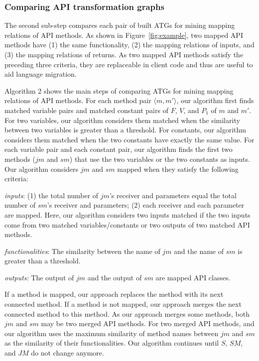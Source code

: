 \subsubsection{Comparing API transformation graphs} The
second sub-step compares each pair of built ATGs for mining mapping
relations of API methods. As shown in Figure~\ref{fig:example}, two
mapped API methods have (1) the same functionality, (2) the mapping
relations of inputs, and (3) the mapping relations of returns. As
two mapped API methods satisfy the preceding three criteria, they
are replaceable in client code and thus are useful to aid language
migration.

Algorithm 2 shows the main steps of comparing ATGs for mining
mapping relations of API methods. For each method pair $\langle m,
m'\rangle$, our algorithm first finds matched variable pairs and
matched constant pairs of $F$, $V$, and $P_1$ of $m$ and $m'$. For
two variables, our algorithm considers them matched when the
similarity between two variables is greater than a threshold. For
constants, our algorithm considers them matched when the two
constants have exactly the same value. For each variable pair and
each constant pair, our algorithm finds the first two methods ($jm$
and $sm$) that use the two variables or the two constants as inputs.
Our algorithm considers $jm$ and $sm$ mapped when they satisfy the
following criteria:

\emph{inputs}: (1) the total number of $jm$'s receiver and
parameters equal the total number of $sm$'s receiver and parameters;
(2) each receiver and each parameter are mapped. Here, our algorithm
considers two inputs matched if the two inputs come from two matched
variables/constants or two outputs of two matched API methods.

\emph{functionalities}: The similarity between the name of $jm$ and
the name of $sm$ is greater than a threshold.

\emph{outputs:} The output of $jm$ and the output of $sm$ are mapped
API classes.

If a method is mapped, our approach replaces the method with its
next connected method. If a method is not mapped, our approach
merges the next connected method to this method. As our approach
merges some methods, both $jm$ and $sm$ may be two merged API
methods. For two merged API methods, and our algorithm uses the
maximum similarity of method names between $jm$ and $sm$ as the
similarity of their functionalities. Our algorithm continues until
$S$, $SM$, and $JM$ do not change anymore.


